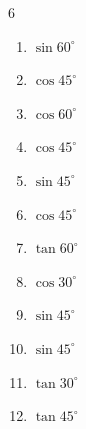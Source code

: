 \begin{multicols}{6}
\begin{enumerate}

  \item $\displaystyle \sin{60^\circ}$


  \item $\displaystyle \cos{45^\circ}$


  \item $\displaystyle \cos{60^\circ}$


  \item $\displaystyle \cos{45^\circ}$


  \item $\displaystyle \sin{45^\circ}$


\columnbreak %

\resetques

  \item $\displaystyle \cos{45^\circ}$


  \item $\displaystyle \tan{60^\circ}$


  \item $\displaystyle \cos{30^\circ}$


  \item $\displaystyle \sin{45^\circ}$


  \item $\displaystyle \sin{45^\circ}$


  \item $\displaystyle \tan{30^\circ}$


  \item $\displaystyle \tan{45^\circ}$


\end{enumerate}
\end{multicols}
